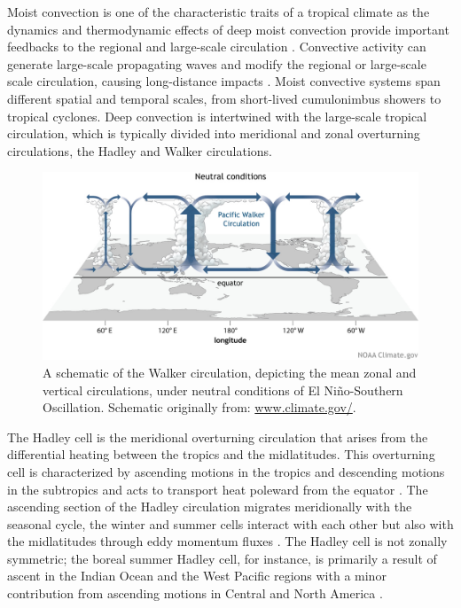 
 Moist convection is one of the characteristic traits of a tropical climate as the dynamics and thermodynamic effects of deep moist convection provide important feedbacks to the regional and large-scale circulation \citep{emanuel1994atmospheric,webster2020dynamics}. 
Convective activity can generate large-scale propagating waves and modify the regional or large-scale scale circulation, causing long-distance impacts \citep{hartmann2015,li2018fundamentals}.
 Moist convective systems span different spatial and temporal scales, from short-lived cumulonimbus showers to tropical cyclones. Deep convection is intertwined with the large-scale tropical circulation, which is typically divided into meridional and zonal overturning circulations, the Hadley and Walker circulations. 
 
\begin{figure}[t!]
\includegraphics[width=\linewidth]{figures/Walker_Neutral_large.jpg}
\caption[The Walker circulation]{A schematic of the Walker circulation, depicting the mean zonal and vertical circulations, under neutral conditions of El Niño-Southern Oscillation. Schematic originally from: \url{www.climate.gov/}. }
\label{fig:walker_schematic}
\end{figure}
 
 
The Hadley cell is the meridional overturning circulation that arises from the differential heating between the tropics and the midlatitudes. This overturning cell is characterized by ascending motions in the tropics and descending motions in the subtropics and acts to transport heat poleward from the equator \citep{lorenz1967}.  The ascending section of the Hadley circulation migrates meridionally with the seasonal cycle, the winter and summer cells interact with each other but also with the midlatitudes through eddy momentum fluxes \citep{bordoni2008monsoons}. 
The Hadley cell is not zonally symmetric; the boreal summer Hadley cell, for instance,  is primarily a result of ascent in the Indian Ocean and the West Pacific regions with a minor contribution from ascending motions in Central and North America \citep{hoskins2020}. 

